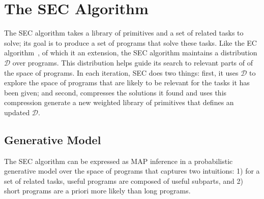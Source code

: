 \documentclass{article} %
\begin{document}



\section{The SEC Algorithm}

The SEC algorithm takes a library of primitives and a set of related tasks to solve; its goal is to produce a set of programs that solve these tasks. Like the EC algorithm~\cite{DBLP:conf/ijcai/DechterMAT13}, of which it an extension, the SEC algorithm maintains a distribution $\mathcal{D}$ over programs. This distribution helps guide its search to relevant parts of of the space of programs. In each iteration, SEC does two things: first, it uses $\mathcal{D}$ to explore the space of programs that are likely to be relevant for the tasks it has been given; and second, compresses the solutions it found and uses this compression generate a new weighted library of primitives that defines an updated $\mathcal{D}$.


\subsection{Generative Model}
The SEC algorithm can be expressed as MAP inference in a probabilistic generative model over the space of programs that captures two intuitions: 1) for a set of related tasks, useful programs are composed of useful subparts, and 2) short programs are a priori more likely than long programs. 
\end{document}
